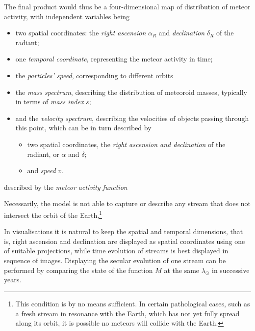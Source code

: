     The final product would thus be a four-dimensional map of distribution of meteor activity, with independent variables being
    \begin{itemize}
        \item two spatial coordinates: the \emph{right ascension} $\alpha_R$ and \emph{declination} $\delta_R$ of the radiant;
        \item one \emph{temporal coordinate}, representing the meteor activity in time;
        \item the \emph{particles' speed}, corresponding to different orbits
        \item the \emph{mass spectrum}, describing the distribution of meteoroid masses, typically in terms of \textit{mass index} $s$;
        \item and the \emph{velocity spectrum}, describing the velocities of objects passing through this point, which can be in turn described by
            \begin{itemize}
                \item two spatial coordinates, the \emph{right ascension and declination} of the radiant, or $\alpha$ and $\delta$;
                \item and \emph{speed} $v$.
            \end{itemize}
    \end{itemize}

    described by the \emph{meteor activity function}

    Necessarily, the model is not able to capture or describe any stream that does not intersect the orbit of the
    Earth,\footnote{This condition is by no means sufficient. In certain pathological cases, such as a fresh stream in resonance
    with the Earth, which has not yet fully spread along its orbit, it is possible no meteors will collide with the Earth.}

    In visualisations it is natural to keep the spatial and temporal dimensions, that is, right ascension and declination are
    displayed as spatial coordinates using one of suitable projections, while time evolution of streams is best displayed
    in sequence of images.
    Displaying the secular evolution of one stream can be performed by comparing the state of the function $M$ at
    the same $\lambda_\odot$ in successive years.

    \citep{balaz+2020}

